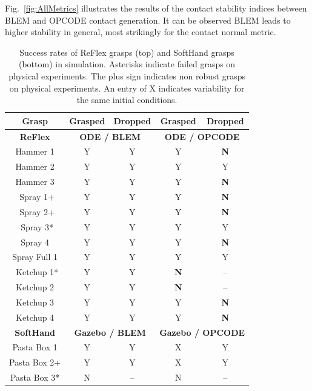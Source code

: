 Fig.~\ref{fig:AllMetrics} illustrates the results of the contact stability indices between BLEM and OPCODE contact generation. It can be observed BLEM leads to higher stability in general, most strikingly for the contact normal metric.

\begin{table}[hbt]
   \begin{center}
   \begin{tabular}{| c | c  c | c c |}
   \hline
   Grasp & Grasped & Dropped & Grasped & Dropped\\
   \hline
    {\bf ReFlex} & \multicolumn{2}{c|}{{\bf ODE / BLEM}} & \multicolumn{2}{c|}{{\bf ODE / OPCODE}} \\
   \cline{1-5}
   Hammer 1	    & Y & Y & Y & {\bf N} \\
   Hammer 2	    & Y & Y & Y & Y \\
   Hammer 3	    & Y & Y & Y & {\bf N} \\
   ~Spray 1+	& Y & Y & Y & {\bf N} \\
   ~Spray 2+	& Y & Y & Y & {\bf N} \\
   ~Spray 3*	& Y & Y & Y & Y \\
   Spray 4	& Y & Y & Y & {\bf N} \\
   Spray Full 1	& Y & Y & Y & Y \\
   ~Ketchup 1*	& Y & Y & {\bf N} & -- \\
   Ketchup 2	& Y & Y & {\bf N} & -- \\
   Ketchup 3	& Y & Y & Y & {\bf N} \\
   Ketchup 4	& Y & Y & Y & {\bf N} \\
   \hline
   {\bf SoftHand} & \multicolumn{2}{c|}{{\bf Gazebo / BLEM}} & \multicolumn{2}{c|}{{\bf Gazebo / OPCODE}} \\
   \hline
   Pasta Box 1  & Y & Y & X & Y \\
   Pasta Box 2+ & Y & Y & X & Y \\
   Pasta Box 3* & N & -- & N  & -- \\
   \hline
   \end{tabular}
   \end{center}
   \caption{Success rates of ReFlex grasps (top) and SoftHand grasps (bottom) in simulation.  Asterisks indicate failed grasps on physical experiments. The plus sign indicates non robust grasps on physical experiments.  An entry of X  indicates variability for the same initial conditions.}
   \label{table:GraspSuccess}
\end{table}

